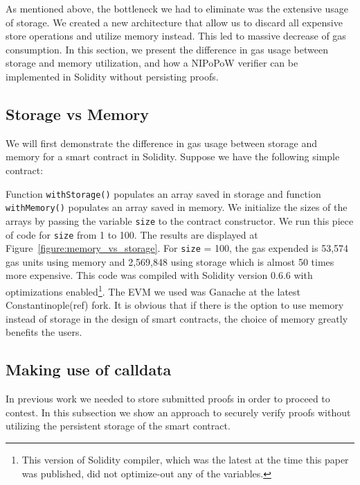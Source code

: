 As mentioned above, the bottleneck we had to eliminate was the extensive usage
of storage. We created a new architecture that allow us to discard all
expensive store operations and utilize memory instead. This led to massive
decrease of gas consumption. In this section, we present the difference in gas
usage between storage and memory utilization, and how a NIPoPoW verifier can be
implemented in Solidity without persisting proofs.

\subsection{Storage vs Memory}

We will first demonstrate the difference in gas usage between storage and
memory for a smart contract in Solidity. Suppose we have the following simple
contract:



Function \texttt{withStorage()} populates an array saved in storage and
function \texttt{withMemory()} populates an array saved in memory. We
initialize the sizes of the arrays by passing the variable \texttt{size} to the
contract constructor. We run this piece of code for \texttt{size} from 1 to
100. The results are displayed at Figure~\ref{figure:memory_vs_storage}. For
\texttt{size} = 100, the gas expended is 53,574 gas units using memory and
2,569,848 using storage which is almost 50 times more expensive. This code was
compiled with Solidity version 0.6.6 with optimizations enabled\footnote{This
version of Solidity compiler, which was the latest at the time this paper was
published, did not optimize-out any of the variables.}. The EVM we used  was
Ganache at the latest Constantinople(ref) fork. It is obvious that if there is
the option to use memory instead of storage in the design of smart contracts,
the choice of memory greatly benefits the users.



\subsection{Making use of calldata}

In previous work we needed to store submitted proofs in order to proceed to
contest. In this subsection we show an approach to securely verify proofs
without utilizing the persistent storage of the smart contract.


